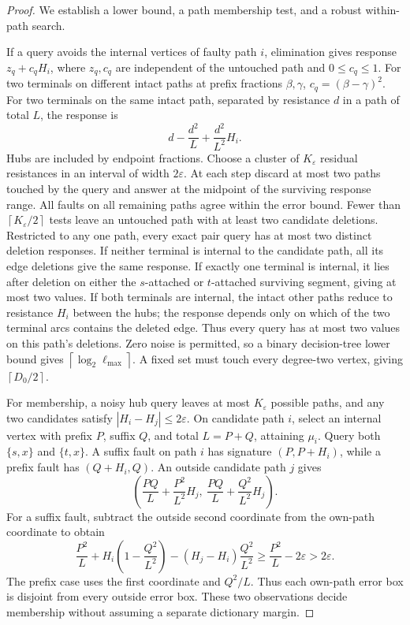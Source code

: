 \documentclass[11pt,letterpaper]{article}
\newcommand{\ceil}[1]{\left\lceil #1\right\rceil}
\begin{document}
\begin{proof}
We establish a lower bound, a path membership test, and a robust within-path search.

If a query avoids the internal vertices of faulty path $i$, elimination gives response $z_q+c_qH_i$, where $z_q,c_q$ are independent of the untouched path and $0\le c_q\le1$. For two terminals on different intact paths at prefix fractions $\beta,\gamma$, $c_q=(\beta-\gamma)^2$. For two terminals on the same intact path, separated by resistance $d$ in a path of total $L$, the response is
\[
 d-\frac{d^2}{L}+\frac{d^2}{L^2}H_i.
\]
Hubs are included by endpoint fractions. Choose a cluster of $K_\varepsilon$ residual resistances in an interval of width $2\varepsilon$. At each step discard at most two paths touched by the query and answer at the midpoint of the surviving response range. All faults on all remaining paths agree within the error bound. Fewer than $\ceil{K_\varepsilon/2}$ tests leave an untouched path with at least two candidate deletions. Restricted to any one path, every exact pair query has at most two distinct deletion responses. If neither terminal is internal to the candidate path, all its edge deletions give the same response. If exactly one terminal is internal, it lies after deletion on either the $s$-attached or $t$-attached surviving segment, giving at most two values. If both terminals are internal, the intact other paths reduce to resistance $H_i$ between the hubs; the response depends only on which of the two terminal arcs contains the deleted edge. Thus every query has at most two values on this path's deletions. Zero noise is permitted, so a binary decision-tree lower bound gives $\ceil{\log_2\ell_{\max}}$. A fixed set must touch every degree-two vertex, giving $\ceil{D_0/2}$.

For membership, a noisy hub query leaves at most $K_\varepsilon$ possible paths, and any two candidates satisfy $|H_i-H_j|\le2\varepsilon$. On candidate path $i$, select an internal vertex with prefix $P$, suffix $Q$, and total $L=P+Q$, attaining $\mu_i$. Query both $\{s,x\}$ and $\{t,x\}$. A suffix fault on path $i$ has signature $(P,P+H_i)$, while a prefix fault has $(Q+H_i,Q)$. An outside candidate path $j$ gives
\[
 \left(\frac{PQ}{L}+\frac{P^2}{L^2}H_j,\
       \frac{PQ}{L}+\frac{Q^2}{L^2}H_j\right).
\]
For a suffix fault, subtract the outside second coordinate from the own-path coordinate to obtain
\[
 \frac{P^2}{L}+H_i\left(1-\frac{Q^2}{L^2}\right)
 -(H_j-H_i)\frac{Q^2}{L^2}
 \ge\frac{P^2}{L}-2\varepsilon>2\varepsilon.
\]
The prefix case uses the first coordinate and $Q^2/L$. Thus each own-path error box is disjoint from every outside error box. These two observations decide membership without assuming a separate dictionary margin.


\end{proof}
\end{document}
